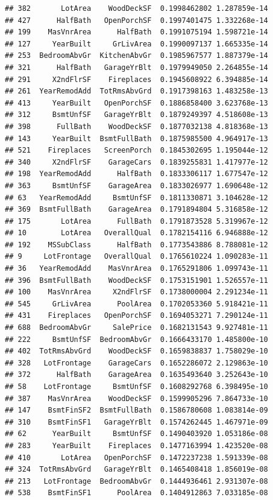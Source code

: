 \documentclass[american,]{article}
\theoremstyle{definition}
\theoremstyle{definition}
\theoremstyle{definition}
\theoremstyle{remark}
\begin{document}
\begin{verbatim}
## 382       LotArea    WoodDeckSF  0.1998462802 1.287859e-14
## 427      HalfBath   OpenPorchSF  0.1997401475 1.332268e-14
## 199    MasVnrArea      HalfBath  0.1991075194 1.598721e-14
## 127     YearBuilt     GrLivArea  0.1990097137 1.665335e-14
## 253  BedroomAbvGr  KitchenAbvGr  0.1985967577 1.887379e-14
## 321      HalfBath   GarageYrBlt  0.1979949050 2.264855e-14
## 291     X2ndFlrSF    Fireplaces  0.1945608922 6.394885e-14
## 261  YearRemodAdd  TotRmsAbvGrd  0.1917398163 1.483258e-13
## 413     YearBuilt   OpenPorchSF  0.1886858400 3.623768e-13
## 312     BsmtUnfSF   GarageYrBlt  0.1879249397 4.518608e-13
## 398      FullBath    WoodDeckSF  0.1877032138 4.818368e-13
## 143     YearBuilt  BsmtFullBath  0.1875985500 4.964917e-13
## 521    Fireplaces   ScreenPorch  0.1845302695 1.195044e-12
## 340     X2ndFlrSF    GarageCars  0.1839255831 1.417977e-12
## 198  YearRemodAdd      HalfBath  0.1833306117 1.677547e-12
## 363     BsmtUnfSF    GarageArea  0.1833026977 1.690648e-12
## 63   YearRemodAdd     BsmtUnfSF  0.1811330871 3.104628e-12
## 369  BsmtFullBath    GarageArea  0.1791894804 5.316858e-12
## 175       LotArea      FullBath  0.1791873528 5.319967e-12
## 10        LotArea   OverallQual  0.1782154116 6.946888e-12
## 192    MSSubClass      HalfBath  0.1773543886 8.788081e-12
## 9     LotFrontage   OverallQual  0.1765610224 1.090283e-11
## 36   YearRemodAdd    MasVnrArea  0.1765291806 1.099743e-11
## 396  BsmtFullBath    WoodDeckSF  0.1753151901 1.526557e-11
## 100    MasVnrArea     X2ndFlrSF  0.1738000004 2.291234e-11
## 545     GrLivArea      PoolArea  0.1702053360 5.918421e-11
## 431    Fireplaces   OpenPorchSF  0.1694053271 7.290124e-11
## 688  BedroomAbvGr     SalePrice  0.1682131543 9.927481e-11
## 222     BsmtUnfSF  BedroomAbvGr  0.1666433170 1.485800e-10
## 402  TotRmsAbvGrd    WoodDeckSF  0.1659838837 1.758029e-10
## 328   LotFrontage    GarageCars  0.1652286072 2.129863e-10
## 372      HalfBath    GarageArea  0.1635493640 3.252643e-10
## 58    LotFrontage     BsmtUnfSF  0.1608292768 6.398495e-10
## 387    MasVnrArea    WoodDeckSF  0.1599905296 7.864733e-10
## 147    BsmtFinSF2  BsmtFullBath  0.1586780608 1.083814e-09
## 310    BsmtFinSF1   GarageYrBlt  0.1574262445 1.467971e-09
## 62      YearBuilt     BsmtUnfSF  0.1490403920 1.053186e-08
## 283     YearBuilt    Fireplaces  0.1477163994 1.423520e-08
## 410       LotArea   OpenPorchSF  0.1472237238 1.591339e-08
## 324  TotRmsAbvGrd   GarageYrBlt  0.1465408418 1.856019e-08
## 213   LotFrontage  BedroomAbvGr  0.1444936461 2.931307e-08
## 538    BsmtFinSF1      PoolArea  0.1404912863 7.033185e-08

\end{verbatim}
\end{document}
